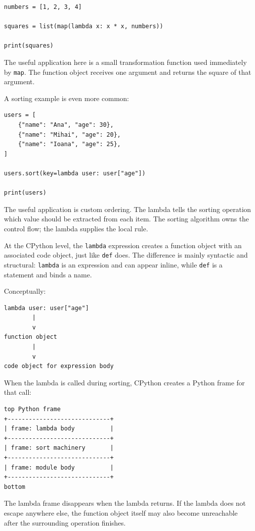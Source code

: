 \documentclass[a4paper,twoside]{report}
\begin{document}
\begin{verbatim}
numbers = [1, 2, 3, 4]

squares = list(map(lambda x: x * x, numbers))

print(squares)
\end{verbatim}

The useful application here is a small transformation function used immediately by \texttt{map}. The function object receives one argument and returns the square of that argument.

A sorting example is even more common:

\begin{verbatim}
users = [
    {"name": "Ana", "age": 30},
    {"name": "Mihai", "age": 20},
    {"name": "Ioana", "age": 25},
]

users.sort(key=lambda user: user["age"])

print(users)
\end{verbatim}

The useful application is custom ordering. The lambda tells the sorting operation which value should be extracted from each item. The sorting algorithm owns the control flow; the lambda supplies the local rule.

At the CPython level, the \texttt{lambda} expression creates a function object with an associated code object, just like \texttt{def} does. The difference is mainly syntactic and structural: \texttt{lambda} is an expression and can appear inline, while \texttt{def} is a statement and binds a name.

Conceptually:

\begin{verbatim}
lambda user: user["age"]
        |
        v
function object
        |
        v
code object for expression body
\end{verbatim}

When the lambda is called during sorting, CPython creates a Python frame for that call:

\begin{verbatim}
top Python frame
+-----------------------------+
| frame: lambda body          |
+-----------------------------+
| frame: sort machinery       |
+-----------------------------+
| frame: module body          |
+-----------------------------+
bottom
\end{verbatim}

The lambda frame disappears when the lambda returns. If the lambda does not escape anywhere else, the function object itself may also become unreachable after the surrounding operation finishes.
\end{document}
